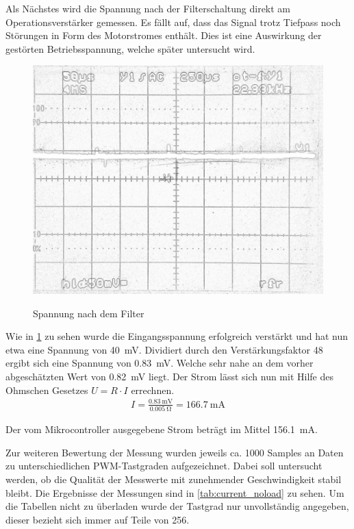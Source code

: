 Als Nächstes wird die Spannung nach der Filterschaltung direkt am Operationsverstärker gemessen. Es fällt auf, dass das Signal trotz Tiefpass noch Störungen in Form des Motorstromes enthält.
Dies ist eine Auswirkung der gestörten Betriebsspannung, welche später untersucht wird.


\begin{figure}[H]
\centering
\includegraphics[width=.8\textwidth]{filter_ausgang.png}\\
\caption{Spannung nach dem Filter}%
\label{fig:filter_ausgang}
\end{figure}


Wie in \cref{fig:filter_ausgang} zu sehen wurde die Eingangsspannung erfolgreich verstärkt und hat nun etwa eine Spannung von \SI{40}{\mV}. Dividiert durch den Verstärkungsfaktor 48 ergibt sich eine Spannung von 
\SI{0,83}{\mV}. Welche sehr nahe an dem vorher abgeschätzten Wert von \SI{0,82}{\mV} liegt. Der Strom lässt sich nun mit Hilfe des Ohmschen Gesetzes $U=R\cdot I$ errechnen.
\begin{align*}
I=\frac{\SI{0,83}{\mV}}{\SI{0,005}{\ohm}}=\SI{166,7}{\mA}
\end{align*}

Der vom Mikrocontroller ausgegebene Strom beträgt im Mittel \SI{156,1}{\mA}.

Zur weiteren Bewertung der Messung wurden jeweils ca. 1000 Samples an Daten zu unterschiedlichen PWM-Tastgraden aufgezeichnet.
Dabei soll untersucht werden, ob die Qualität der Messwerte mit zunehmender Geschwindigkeit stabil bleibt.
Die Ergebnisse der Messungen sind in \cref{tab:current_noload} zu sehen.
Um die Tabellen nicht zu überladen wurde der Tastgrad nur unvollständig angegeben, dieser bezieht sich immer auf Teile von 256.

